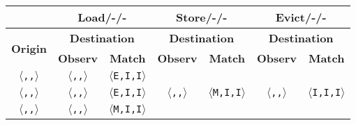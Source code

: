 \begin{tabular}{|c|c|c|c|c|c|c|}
\cline{2-7}
\multicolumn{1}{c|}{}
 & \multicolumn{2}{c|}{\textbf{Load/-/-}}
 & \multicolumn{2}{c|}{\textbf{Store/-/-}}
 & \multicolumn{2}{c|}{\textbf{Evict/-/-}}
\\
\hline
   \multirow{2}{*}{\textbf{Origin}}
 & \multicolumn{2}{c|}{\textbf{Destination}}
 & \multicolumn{2}{c|}{\textbf{Destination}}
 & \multicolumn{2}{c|}{\textbf{Destination}}
\\
 & \textbf{Observ}
 & \textbf{Match}
 & \textbf{Observ}
 & \textbf{Match}
 & \textbf{Observ}
 & \textbf{Match}
\\
\hline

\texttt{$\langle$\benchi{},\benchi{},\benchi{}$\rangle$}

& \texttt{$\langle$\benche{},\benchi{},\benchi{}$\rangle$}
& \texttt{$\langle$E,I,I$\rangle$}

& \multirow{16}{*}{\texttt{$\langle$\benchm{},\benchi{},\benchi{}}$\rangle$}
& \multirow{16}{*}{\texttt{$\langle$M,I,I}$\rangle$}

& \multirow{3}{*}{\texttt{$\langle$\benchi{},\benchi{},\benchi{}}$\rangle$}
& \multirow{3}{*}{\texttt{$\langle$I,I,I}$\rangle$}
\\
\cline{1-3}

\texttt{$\langle$\benche{},\benchi{},\benchi{}$\rangle$}

& \texttt{$\langle$\benche{},\benchi{},\benchi{}$\rangle$}
& \texttt{$\langle$E,I,I$\rangle$}

&
&

&%
&%
\\
\cline{1-3}

\texttt{$\langle$\benchm{},\benchi{},\benchi{}$\rangle$}

& \texttt{$\langle$\benchm{},\benchi{},\benchi{}$\rangle$}
& \texttt{$\langle$M,I,I$\rangle$}


\end{tabular}
